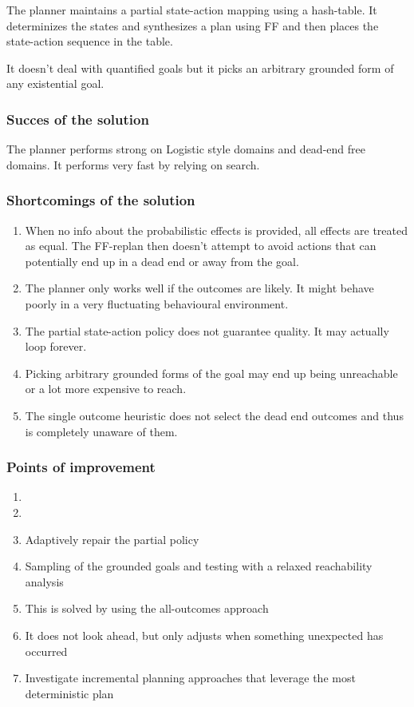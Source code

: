 \documentclass[runningheads,a4paper]{llncs}
\begin{document}
The planner maintains a partial state-action mapping using a hash-table. It determinizes the states and synthesizes a plan using FF and then places the state-action sequence in the table.

It doesn't deal with quantified goals but it picks an arbitrary grounded form of any existential goal.

\subsubsection{Succes of the solution}
The planner performs strong on Logistic style domains and dead-end free domains. It performs very fast by relying on search.

\subsubsection{Shortcomings of the solution}
\begin{enumerate}
	\item When no info about the probabilistic effects is provided, all effects are treated as equal. The FF-replan then doesn't attempt to avoid actions that can potentially end up in a dead end or away from the goal.
	\item  The planner only works well if the outcomes are likely. It might behave poorly in a very fluctuating behavioural environment.
	\item The partial state-action policy does not guarantee quality. It may actually loop forever.
	\item Picking arbitrary grounded forms of the goal may end up being unreachable or a lot more expensive to reach.
	\item The single outcome heuristic does not select the dead end outcomes and thus is completely unaware of them.
\end{enumerate}

\subsubsection{Points of improvement}
\begin{enumerate}
	\item
	\item
	\item Adaptively repair the partial policy
	\item Sampling of the grounded goals and testing with a relaxed reachability analysis
	\item This is solved by using the all-outcomes approach
	\item It does not look ahead, but only adjusts when something unexpected has occurred

	\item Investigate incremental planning approaches that leverage the most deterministic plan
\end{enumerate}
\end{document}
